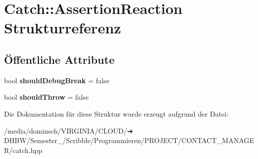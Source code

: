 \hypertarget{structCatch_1_1AssertionReaction}{}\section{Catch\+:\+:Assertion\+Reaction Strukturreferenz}
\label{structCatch_1_1AssertionReaction}
\subsection*{Öffentliche Attribute}
\begin{DoxyCompactItemize}
\item 
\mbox{\label{structCatch_1_1AssertionReaction_adcf30fb90ff20d9789df78d424652497}} 
bool {\bfseries should\+Debug\+Break} = false
\item 
\mbox{\label{structCatch_1_1AssertionReaction_a82c8d95a2c1b6a331bde66982a8e090f}} 
bool {\bfseries should\+Throw} = false
\end{DoxyCompactItemize}


Die Dokumentation für diese Struktur wurde erzeugt aufgrund der Datei\+:\begin{DoxyCompactItemize}
\item 
/media/dominsch/\+V\+I\+R\+G\+I\+N\+I\+A/\+C\+L\+O\+U\+D/➔ D\+H\+B\+W/\+Semester\+\_/\+Scribble/\+Programmieren/\+P\+R\+O\+J\+E\+C\+T/\+C\+O\+N\+T\+A\+C\+T\+\_\+\+M\+A\+N\+A\+G\+E\+R/catch.\+hpp\end{DoxyCompactItemize}
